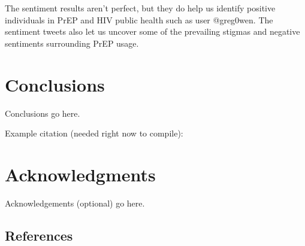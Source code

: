 \documentclass{sig-alternate-05-2015}
\begin{document}
The sentiment results aren't perfect, but they do help us identify positive individuals in PrEP and HIV public health such as user @greg0wen. The sentiment tweets also let us uncover some of the prevailing stigmas and negative sentiments surrounding PrEP usage.




\section{Conclusions}

Conclusions go here.

Example citation (needed right now to compile):\cite{Lamport:LaTeX}


\section{Acknowledgments}

Acknowledgements (optional) go here.

%

%
%


\subsection{References}
\end{document}
